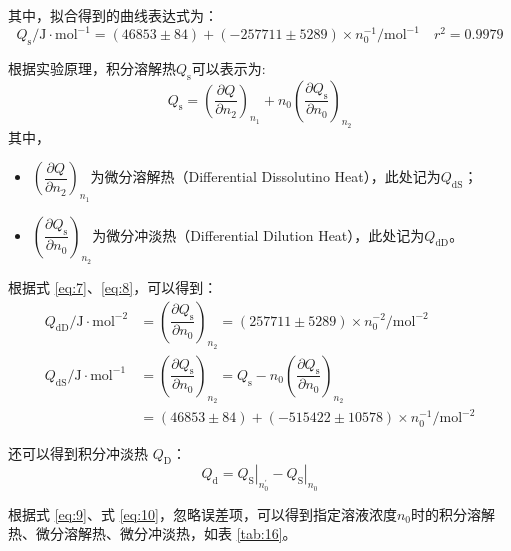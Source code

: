 \documentclass[cn,hazy,pku,12pt,normal,math=newtx,cite=super]{elegantnote}
\begin{document}
其中，拟合得到的曲线表达式为：
\begin{equation}\label{eq:7}
     Q_{\mathrm{s}}/\mathrm{J\cdot mol^{-1}} = (46853 \pm 84) + (-257711 \pm 5289) \times n_0^{-1}/\mathrm{mol^{-1}} \quad r^2 = 0.9979
\end{equation}

根据实验原理，积分溶解热$Q_{\mathrm{s}}$可以表示为:
\begin{equation}\label{eq:8}
    Q_{\mathrm{s}} = \left(\frac{\partial Q}{\partial n_2}\right)_{n_1} + n_0\left(\frac{\partial Q_{\mathrm{s}}}{\partial n_0}\right)_{n_2}
\end{equation}
其中，
\begin{itemize}
    \item $\left(\dfrac{\partial Q}{\partial n_2}\right)_{n_1}$为微分溶解热（Differential Dissolutino Heat），此处记为$Q_\mathrm{dS}$；
    \item $\left(\dfrac{\partial Q_{\mathrm{s}}}{\partial n_0}\right)_{n_2}$为微分冲淡热（Differential Dilution Heat），此处记为$Q_\mathrm{dD}$。
\end{itemize}

根据式 \eqref{eq:7}、\eqref{eq:8}，可以得到：
\begin{equation}\label{eq:9}
    \begin{aligned}
        Q_\mathrm{dD}/\mathrm{J\cdot mol^{-2}} &= \left(\dfrac{\partial Q_{\mathrm{s}}}{\partial n_0}\right)_{n_2} = (257711 \pm 5289) \times n_0^{-2}/\mathrm{mol^{-2}} \\
        Q_\mathrm{dS}/\mathrm{J\cdot mol^{-1}} &= \left(\dfrac{\partial Q_{\mathrm{s}}}{\partial n_0}\right)_{n_2} = Q_{\mathrm{s}} - n_0\left(\dfrac{\partial Q_{\mathrm{s}}}{\partial n_0}\right)_{n_2} \\
        &= (46853 \pm 84) + (-515422 \pm 10578) \times n_0^{-1}/\mathrm{mol^{-2}} 
    \end{aligned}
\end{equation}

还可以得到积分冲淡热 $Q_\mathrm{D}$：
\begin{equation}\label{eq:10}
    Q_\mathrm{d} = \left.Q_\mathrm{S}\right|_{n_0^\prime} -\left.Q_\mathrm{S}\right|_{n_0}
\end{equation}

根据式 \eqref{eq:9}、式 \eqref{eq:10}，忽略误差项，可以得到指定溶液浓度$n_0$时的积分溶解热、微分溶解热、微分冲淡热，如表 \ref{tab:16}。
\end{document}
